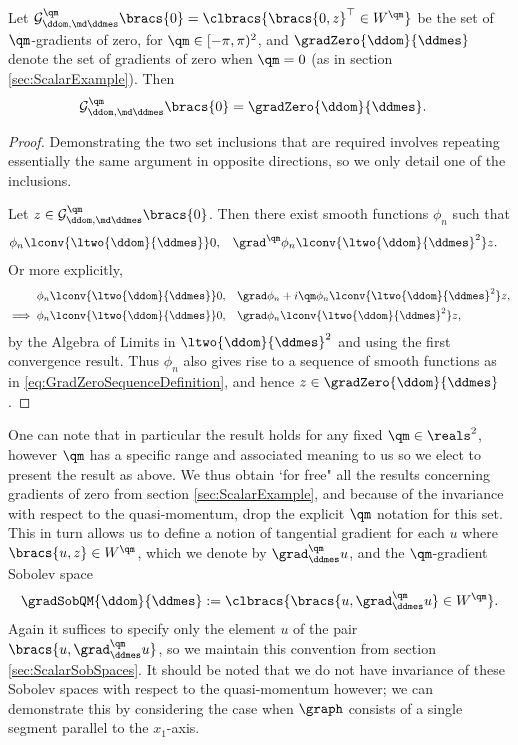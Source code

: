 \begin{prop} \label{prop:GradZeroInvarientUnderQM}
	Let $\mathcal{G}_{\ddom, \md \ddmes}^\qm\bracs{0} = \clbracs{\bracs{0,z}^\top \in W^\qm}$ be the set of $\qm$-gradients of zero, for $\qm\in[-\pi,\pi)^2$, and $\gradZero{\ddom}{\ddmes}$ denote the set of gradients of zero when $\qm=0$ (as in section \ref{sec:ScalarExample}).
	Then
	\begin{align*}
		\mathcal{G}_{\ddom, \md \ddmes}^\qm\bracs{0} &= \gradZero{\ddom}{\ddmes}.
	\end{align*}
\end{prop}
\begin{proof}
	Demonstrating the two set inclusions that are required involves repeating essentially the same argument in opposite directions, so we only detail one of the inclusions. \newline
	
	Let $z\in\mathcal{G}_{\ddom, \md \ddmes}^\qm\bracs{0}$.
	Then there exist smooth functions $\phi_n$ such that
	\begin{align*}
		\phi_n \lconv{\ltwo{\ddom}{\ddmes}}0, &\quad \grad^\qm\phi_n\lconv{\ltwo{\ddom}{\ddmes}^2}z.
	\end{align*}
	Or more explicitly,
	\begin{align*}
		\phi_n \lconv{\ltwo{\ddom}{\ddmes}}0, &\quad \grad\phi_n + i\qm\phi_n\lconv{\ltwo{\ddom}{\ddmes}^2}z, \\
		\implies \phi_n \lconv{\ltwo{\ddom}{\ddmes}}0, &\quad \grad\phi_n \lconv{\ltwo{\ddom}{\ddmes}^2}z,
	\end{align*}	
	by the Algebra of Limits in $\ltwo{\ddom}{\ddmes}^2$ and using the first convergence result.
	Thus $\phi_n$ also gives rise to a sequence of smooth functions as in \eqref{eq:GradZeroSequenceDefinition}, and hence $z\in\gradZero{\ddom}{\ddmes}$.
\end{proof}

One can note that in particular the result holds for any fixed $\qm\in\reals^2$, however $\qm$ has a specific range and associated meaning to us so we elect to present the result as above.
We thus obtain `for free" all the results concerning gradients of zero from section \ref{sec:ScalarExample}, and because of the invariance with respect to the quasi-momentum, drop the explicit $\qm$ notation for this set.
This in turn allows us to define a notion of tangential gradient for each $u$ where $\bracs{u,z}\in W^\qm$, which we denote by $\grad_\ddmes^\qm u$, and the $\qm$-gradient Sobolev space
\begin{align*}
	\gradSobQM{\ddom}{\ddmes} := \clbracs{\bracs{u,\grad_\ddmes^\qm u}\in W^\qm}.
\end{align*}
Again it suffices to specify only the element $u$ of the pair $\bracs{u,\grad_\ddmes^\qm u}$, so we maintain this convention from section \ref{sec:ScalarSobSpaces}.
It should be noted that we do not have invariance of these Sobolev spaces with respect to the quasi-momentum however; we can demonstrate this by considering the case when $\graph$ consists of a single segment parallel to the $x_1$-axis.

